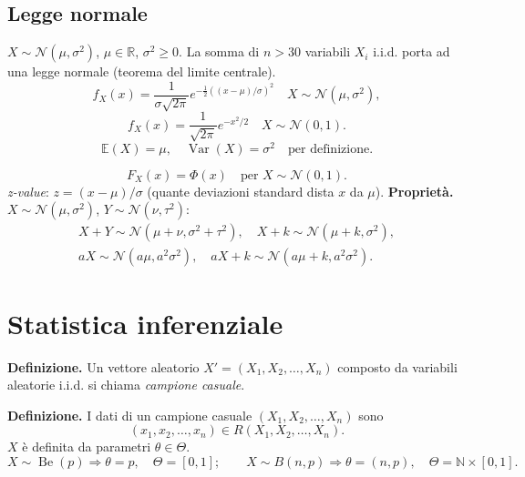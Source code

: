\subsection*{Legge normale}
$X\sim\mathcal N(\mu,\sigma^2)$, $\mu\in\mathbb R$, $\sigma^2\ge0$.
La somma di $n>30$ variabili $X_i$ i.i.d. porta ad una legge normale (teorema del limite centrale).
\[\boxed{f_X(x)=\frac1{\sigma\sqrt{2\pi}}e^{-\frac12((x-\mu)/\sigma)^2}}\quad X\sim\mathcal N(\mu,\sigma^2),\]
\[f_X(x)=\frac1{\sqrt{2\pi}}e^{-x^2/2}\quad X\sim\mathcal N(0,1).\]
\[\boxed{\mathbb E(X)=\mu,\quad\operatorname{Var}(X)=\sigma^2}\quad\text{per definizione}.\]
\begin{center}\end{center}
\[F_X(x)=\Phi(x)\quad\text{per }X\sim\mathcal N(0,1).\]
\textit{z-value}: $z=(x-\mu)/\sigma$ (quante deviazioni standard dista $x$ da $\mu$).
\textbf{Proprietà.} $X\sim\mathcal N(\mu,\sigma^2)$, $Y\sim\mathcal N(\nu,\tau^2)$:
\begin{gather*}
X+Y\sim\mathcal N(\mu+\nu,\sigma^2+\tau^2),\quad X+k\sim\mathcal N(\mu+k,\sigma^2),\\
aX\sim\mathcal N(a\mu,a^2\sigma^2),\quad aX+k\sim\mathcal N(a\mu+k,a^2\sigma^2).
\end{gather*}
\section*{Statistica inferenziale}
\textbf{Definizione.} Un vettore aleatorio $X'=(X_1,X_2,\ldots,X_n)$ composto da variabili aleatorie i.i.d. si chiama \emph{campione casuale}.

\textbf{Definizione.} I dati di un campione casuale $(X_1,X_2,\ldots,X_n)$ sono\[ (x_1,x_2,\ldots,x_n)\in R(X_1,X_2,\ldots,X_n).\]
$X$ è definita da parametri $\theta\in\Theta$.
\[X\sim\operatorname{Be}(p)\Rightarrow\theta=p,\quad\Theta=[0,1];\qquad
X\sim B(n,p)\Rightarrow\theta=(n,p),\quad\Theta=\mathbb N\times[0,1].\]
